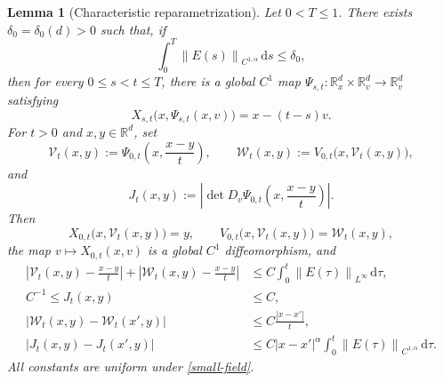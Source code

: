 \documentclass[11pt]{article}
\newtheorem{lemma}[theorem]{Lemma}
\newcommand{\R}{\mathbb R}
\newcommand{\norm}[1]{\left\lVert #1\right\rVert}
\newcommand{\dd}{\,\mathrm d}
\begin{document}
\begin{lemma}[Characteristic reparametrization]\label{lem:twist}
Let $0<T\leq1$.  There exists $\delta_0=\delta_0(d)>0$ such that, if
\begin{equation}\label{small-field}
 \int_0^T\norm{E(s)}_{C^{1,\alpha}}\dd s\leq\delta_0,
\end{equation}
then for every $0\leq s<t\leq T$, there is a global $C^1$ map
$\Psi_{s,t}:\R^d_x\times\R^d_v\to\R^d_v$ satisfying
\begin{equation}\label{Psi-definition}
 X_{s,t}\bigl(x,\Psi_{s,t}(x,v)\bigr)=x-(t-s)v.
\end{equation}
For $t>0$ and $x,y\in\R^d$, set
\begin{equation}\label{VWJ-definition}
 \mathcal V_t(x,y)
 :=\Psi_{0,t}\left(x,\frac{x-y}{t}\right),\qquad
 \mathcal W_t(x,y)
 :=V_{0,t}\bigl(x,\mathcal V_t(x,y)\bigr),
\end{equation}
and
\begin{equation}\label{J-definition}
 J_t(x,y)
 :=\left|\det D_v\Psi_{0,t}
       \left(x,\frac{x-y}{t}\right)\right|.
\end{equation}
Then
\begin{equation}\label{endpoint-identities}
 X_{0,t}\bigl(x,\mathcal V_t(x,y)\bigr)=y,\qquad
 V_{0,t}\bigl(x,\mathcal V_t(x,y)\bigr)=\mathcal W_t(x,y),
\end{equation}
the map $v\mapsto X_{0,t}(x,v)$ is a global $C^1$ diffeomorphism, and
 \begin{align}
 \left|\mathcal V_t(x,y)-\frac{x-y}{t}\right|
 +\left|\mathcal W_t(x,y)-\frac{x-y}{t}\right|
 &\leq C\int_0^t\norm{E(\tau)}_{L^\infty}\dd\tau,\label{VWfree}\\
 C^{-1}\leq J_t(x,y)&\leq C,\label{twistbounds}\\
 \left|\mathcal W_t(x,y)-\mathcal W_t(x',y)\right|
 &\leq C\frac{|x-x'|}{t},\label{W-Lipschitz}\\
 |J_t(x,y)-J_t(x',y)|
 &\leq C|x-x'|^\alpha
       \int_0^t\norm{E(\tau)}_{C^{1,\alpha}}\dd\tau.\label{Jholder}
\end{align} 
All constants are uniform under \eqref{small-field}.
\end{lemma}
\end{document}

